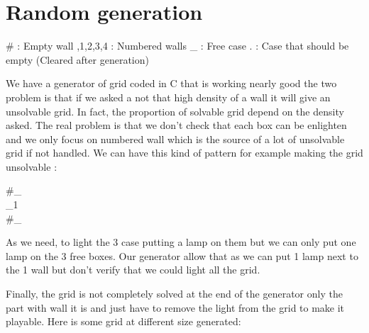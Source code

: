 \documentclass[a4paper]{article}
\begin{document}
\section{Random generation}
\begin{center}
 \# : Empty wall ,1,2,3,4 : Numbered walls  \newline \_ : Free case \qquad   . : Case that should be empty (Cleared after generation)
\end{center}
We have a generator of grid coded in C that is working nearly good the two problem is that if we asked a not that high density of a wall it will give an unsolvable grid. In fact, the proportion of solvable grid depend on the density asked. The real problem is that we don't check that each box can be enlighten and we only focus on numbered wall which is the source of a lot of unsolvable grid if not handled. We can have this kind of pattern for example making the grid unsolvable :
\begin{center}
\#\_ \\
\_1 \\
\#\_ \\
\end{center}


As we need, to light the 3 case putting a lamp on them but we can only put one lamp on the 3 free boxes. Our generator allow that as we can put 1 lamp next to the 1 wall but don't verify that we could light all the grid.

Finally, the grid is not completely solved at the end of the generator only the part with wall it is and just have to remove the light from the grid to make it playable. 
Here is some grid at different size generated: 
\newline
\end{document}
